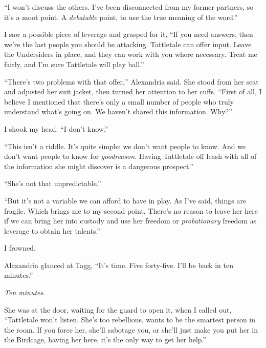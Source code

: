 ``I won't discuss the others.  I've been disconnected from my former partners, so it's a moot point.  A \emph{debatable} point, to use the true meaning of the word.''



I saw a possible piece of leverage and grasped for it, ``If you need answers, then we're the last people you should be attacking.  Tattletale can offer input.  Leave the Undersiders in place, and they can work with you where necessary.  Treat me fairly, and I'm sure Tattletale will play ball.''



``There's two problems with that offer,'' Alexandria said.  She stood from her seat and adjusted her suit jacket, then turned her attention to her cuffs.  ``First of all, I believe I mentioned that there's only a small number of people who truly understand what's going on.  We haven't shared this information.  Why?''



I shook my head.  ``I don't know.''



``This isn't a riddle.  It's quite simple: we don't want people to know.  And we don't want people to know for \emph{good}\emph{reason}.  Having Tattletale off leash with all of the information she might discover is a dangerous prospect.''



``She's not that unpredictable.''



``But it's not a variable we can afford to have in play.  As I've said, things are fragile.  Which brings me to my second point.  There's no reason to leave her here if we can bring her into custody and use her freedom or \emph{probationary} freedom as leverage to obtain her talents.''



I frowned.



Alexandria glanced at Tagg, ``It's time.  Five forty-five.  I'll be back in ten minutes.''



\emph{Ten minutes}.



She was at the door, waiting for the guard to open it, when I called out, ``Tattletale won't listen.  She's too rebellious, wants to be the smartest person in the room.  If you force her, she'll sabotage you, or she'll just make you put her in the Birdcage, having her here, it's the only way to get her help.''



